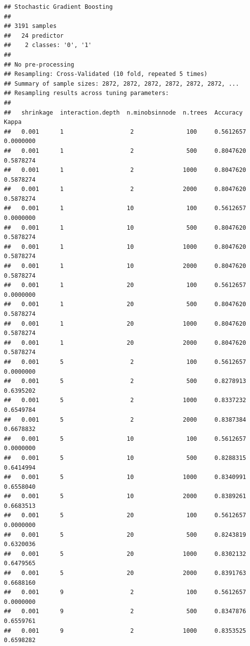 \documentclass[]{article}
\begin{document}
\begin{lstlisting}
## Stochastic Gradient Boosting 
## 
## 3191 samples
##   24 predictor
##    2 classes: '0', '1' 
## 
## No pre-processing
## Resampling: Cross-Validated (10 fold, repeated 5 times) 
## Summary of sample sizes: 2872, 2872, 2872, 2872, 2872, 2872, ... 
## Resampling results across tuning parameters:
## 
##   shrinkage  interaction.depth  n.minobsinnode  n.trees  Accuracy   Kappa    
##   0.001      1                   2               100     0.5612657  0.0000000
##   0.001      1                   2               500     0.8047620  0.5878274
##   0.001      1                   2              1000     0.8047620  0.5878274
##   0.001      1                   2              2000     0.8047620  0.5878274
##   0.001      1                  10               100     0.5612657  0.0000000
##   0.001      1                  10               500     0.8047620  0.5878274
##   0.001      1                  10              1000     0.8047620  0.5878274
##   0.001      1                  10              2000     0.8047620  0.5878274
##   0.001      1                  20               100     0.5612657  0.0000000
##   0.001      1                  20               500     0.8047620  0.5878274
##   0.001      1                  20              1000     0.8047620  0.5878274
##   0.001      1                  20              2000     0.8047620  0.5878274
##   0.001      5                   2               100     0.5612657  0.0000000
##   0.001      5                   2               500     0.8278913  0.6395202
##   0.001      5                   2              1000     0.8337232  0.6549784
##   0.001      5                   2              2000     0.8387384  0.6678832
##   0.001      5                  10               100     0.5612657  0.0000000
##   0.001      5                  10               500     0.8288315  0.6414994
##   0.001      5                  10              1000     0.8340991  0.6558040
##   0.001      5                  10              2000     0.8389261  0.6683513
##   0.001      5                  20               100     0.5612657  0.0000000
##   0.001      5                  20               500     0.8243819  0.6320036
##   0.001      5                  20              1000     0.8302132  0.6479565
##   0.001      5                  20              2000     0.8391763  0.6688160
##   0.001      9                   2               100     0.5612657  0.0000000
##   0.001      9                   2               500     0.8347876  0.6559761
##   0.001      9                   2              1000     0.8353525  0.6598282

\end{lstlisting}
\end{document}
